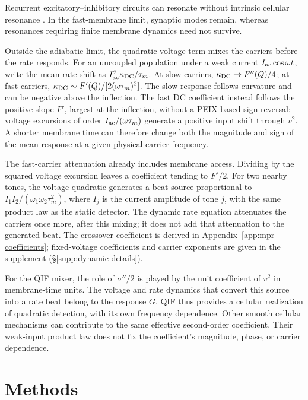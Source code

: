 \documentclass[11pt,a4paper]{article}
\newcommand{\Sig}{\sigma}
\begin{document}
Recurrent excitatory--inhibitory circuits can resonate without intrinsic
cellular resonance \cite{brunelhakim1999,brunelwang2003}. In the fast-membrane
limit, synaptic modes remain, whereas resonances requiring finite membrane
dynamics need not survive.

Outside the adiabatic limit, the quadratic voltage term mixes the carriers
before the rate responds. For an uncoupled population under a weak current
$I_{\rm ac}\cos\omega t$, write the mean-rate shift as
$I_{\rm ac}^2\kappa_{\rm DC}/\tau_m$. At slow carriers,
$\kappa_{\rm DC}\to F''(Q)/4$; at fast carriers,
$\kappa_{\rm DC}\sim F'(Q)/[2(\omega\tau_m)^2]$.
The slow response follows curvature and can be negative above the inflection.
The fast DC coefficient instead follows the positive slope $F'$, largest at the
inflection, without a PEIX-based sign reversal: voltage excursions of order
$I_{\rm ac}/(\omega\tau_m)$ generate a positive input shift through $v^2$.
A shorter membrane time can therefore change both the magnitude and sign
of the mean response at a given physical carrier frequency.

The fast-carrier attenuation already includes membrane access. Dividing by
the squared voltage excursion leaves a coefficient tending to $F'/2$.
For two nearby tones, the voltage quadratic generates a beat source proportional
to $I_1I_2/(\omega_1\omega_2\tau_m^2)$, where $I_j$ is the current amplitude
of tone $j$, with the same product law as the static
detector. The dynamic rate equation attenuates the carriers once more, after
this mixing; it does not add that attenuation to the generated beat.
The crossover coefficient is derived in Appendix~\ref{app:mpr-coefficients};
fixed-voltage coefficients and carrier exponents are given in the supplement
(\S\ref{supp:dynamic-details}).

For the QIF mixer, the role of $\Sig''/2$ is played by the unit coefficient
of $v^2$ in membrane-time units. The voltage and rate dynamics that convert
this source into a rate beat belong to the response $G$.
QIF thus provides a cellular realization of quadratic detection, with its
own frequency dependence. Other smooth cellular mechanisms can contribute
to the same effective second-order coefficient. Their weak-input product law
does not fix the coefficient's magnitude, phase, or carrier dependence.

\section{Methods}
\end{document}
